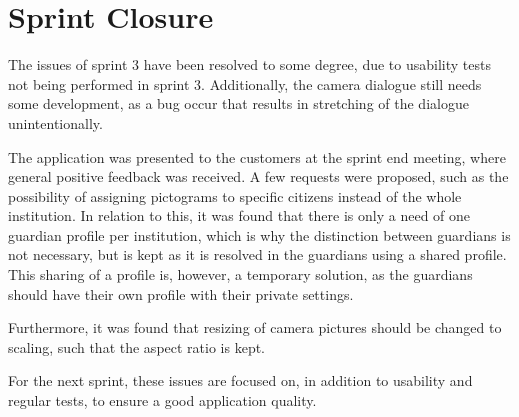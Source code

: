 \section{Sprint Closure}
The issues of sprint 3 have been resolved to some degree, due to usability tests not being performed in sprint 3.
Additionally, the camera dialogue still needs some development, as a bug occur that results in stretching of the dialogue unintentionally.

The application was presented to the customers at the sprint end meeting, where general positive feedback was received.
A few requests were proposed, such as the possibility of assigning pictograms to specific citizens instead of the whole institution.
In relation to this, it was found that there is only a need of one guardian profile per institution, which is why the distinction between guardians is not necessary, but is kept as it is resolved in the guardians using a shared profile.
This sharing of a profile is, however, a temporary solution, as the guardians should have their own profile with their private settings.

Furthermore, it was found that resizing of camera pictures should be changed to scaling, such that the aspect ratio is kept.

For the next sprint, these issues are focused on, in addition to usability and regular tests, to ensure a good application quality.